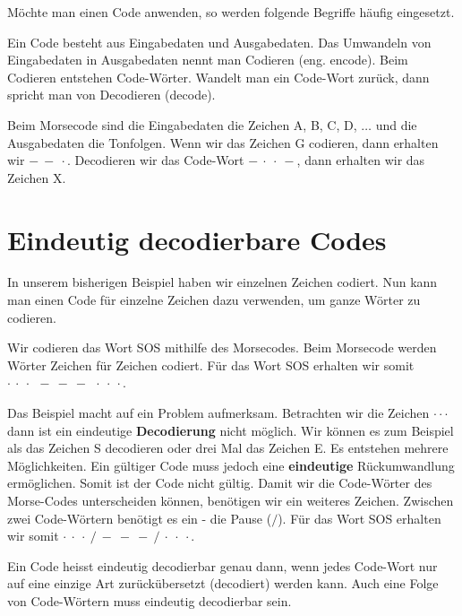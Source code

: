 Möchte man einen Code anwenden, so werden folgende Begriffe häufig eingesetzt.

\begin{definition}
Ein Code besteht aus Eingabedaten und Ausgabedaten. Das Umwandeln von Eingabedaten in Ausgabedaten nennt man Codieren (eng. encode). Beim Codieren entstehen Code-Wörter. Wandelt man ein Code-Wort zurück, dann spricht man von Decodieren (decode). 
\end{definition}

\begin{example}
Beim Morsecode sind die Eingabedaten die Zeichen A, B, C, D, $\dots$ und die Ausgabedaten die Tonfolgen. Wenn wir das Zeichen G codieren, dann erhalten wir $-~-~\cdot$. Decodieren wir das Code-Wort $-~\cdot~\cdot~-$, dann erhalten wir das Zeichen X.
\end{example}

\section{Eindeutig decodierbare Codes}

In unserem bisherigen Beispiel haben wir einzelnen Zeichen codiert. Nun kann man einen Code für einzelne Zeichen dazu verwenden, um ganze Wörter zu codieren.

\begin{example}
Wir codieren das Wort SOS mithilfe des Morsecodes. Beim Morsecode werden Wörter Zeichen für Zeichen codiert. Für das Wort SOS erhalten wir somit $\cdot~\cdot~\cdot~~-~-~-~~\cdot~\cdot~\cdot$.
\end{example}

Das Beispiel macht auf ein Problem aufmerksam. Betrachten wir die Zeichen $\cdot\cdot\cdot$ dann ist ein eindeutige \textbf{Decodierung} nicht möglich. Wir können es zum Beispiel als das Zeichen S decodieren oder drei Mal das Zeichen E. Es entstehen mehrere Möglichkeiten. Ein gültiger Code muss jedoch eine \textbf{eindeutige} Rückumwandlung ermöglichen. Somit ist der Code nicht gültig. Damit wir die Code-Wörter des Morse-Codes unterscheiden können, benötigen wir ein weiteres Zeichen. Zwischen zwei Code-Wörtern benötigt es ein  - die Pause ($/$). Für das Wort SOS erhalten wir somit $\cdot~\cdot~\cdot~/~-~-~-~/~\cdot~\cdot~\cdot$.

\begin{definition}
Ein Code heisst eindeutig decodierbar genau dann, wenn jedes Code-Wort nur auf eine einzige Art zurückübersetzt (decodiert) werden kann. Auch eine Folge von Code-Wörtern muss eindeutig decodierbar sein.
\end{definition}

